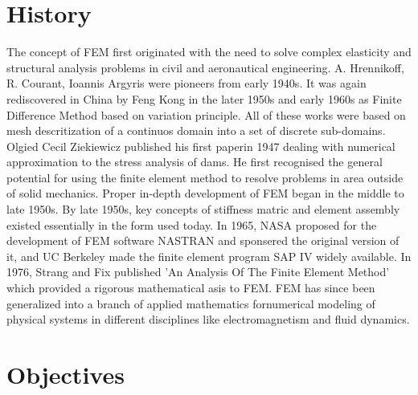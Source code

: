 \section{\bf{History}}
The concept of FEM first originated with the need to solve complex elasticity and structural analysis problems in civil and aeronautical engineering.  A. Hrennikoff\cite{hrennikoff1941solution}, R. Courant\cite{courant1943variational}, Ioannis Argyris\cite{bandela2020finite} were pioneers from early 1940s. It was again rediscovered in China by Feng Kong  in the later 1950s and early 1960s as Finite Difference Method based on variation principle. All of these works were based on mesh descritization of a continuos domain into a set of discrete sub-domains.
	Olgied Cecil Ziekiewicz\cite{stein2009olgierd} published his first paperin 1947 dealing with numerical approximation to the stress analysis of dams. He first recognised the general potential for using the finite element method to resolve problems in area outside of solid mechanics. 
	Proper in-depth development of FEM began in the middle to late 1950s. By late 1950s, key concepts of stiffness matric and element assembly existed essentially in the form used today. In 1965, NASA proposed for the development of FEM software NASTRAN and sponsered the original version of it, and UC Berkeley made the finite element program SAP IV widely available. 
	In 1976, Strang and Fix\cite{strang1973analysis} published 'An Analysis Of The Finite Element Method' which provided a rigorous mathematical asis to FEM. FEM has since been generalized into a branch of applied mathematics fornumerical modeling of physical systems in different disciplines like electromagnetism and fluid dynamics\cite{zienkiewicz2005finite}\cite{banakh2022oscillations}.




\section{{\bf{Objectives}}}

